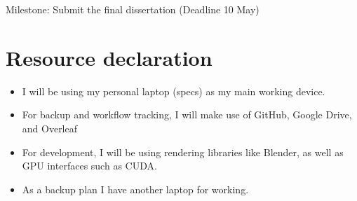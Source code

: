 \documentclass[12pt,a4paper,twoside]{article}
\begin{document}
Milestone: Submit the final dissertation (Deadline 10 May)

\section*{Resource declaration}

\begin{itemize}
\item I will be using my personal laptop (specs) as my main working device.
\item For backup and workflow tracking, I will make use of GitHub, Google Drive, and Overleaf
\item For development, I will be using rendering libraries like Blender, as well as GPU interfaces such as CUDA.
\item As a backup plan I have another laptop for working.
\end{itemize}
\end{document}
